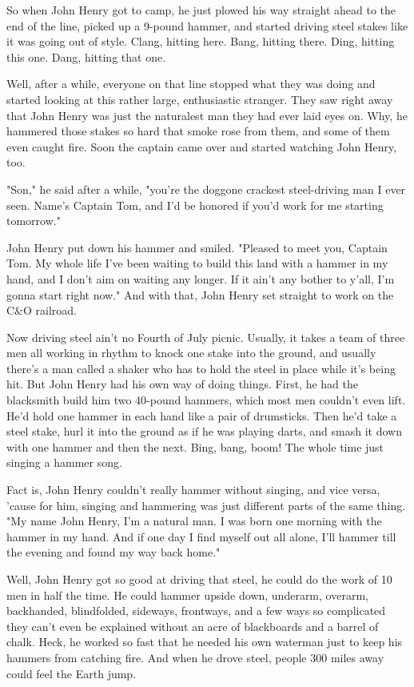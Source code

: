 So when John Henry got to camp, he just plowed his way straight ahead to the end of the line, picked up a 9-pound hammer, and started driving steel stakes like it was going out of style. Clang, hitting here. Bang, hitting there. Ding, hitting this one. Dang, hitting that one.

Well, after a while, everyone on that line stopped what they was doing and started looking at this rather large, enthusiastic stranger. They saw right away that John Henry was just the naturalest man they had ever laid eyes on. Why, he hammered those stakes so hard that smoke rose from them, and some of them even caught fire. Soon the captain came over and started watching John Henry, too.

"Son," he said after a while, "you're the doggone crackest steel-driving man I ever seen. Name's Captain Tom, and I'd be honored if you'd work for me starting tomorrow."

John Henry put down his hammer and smiled. "Pleased to meet you, Captain Tom. My whole life I've been waiting to build this land with a hammer in my hand, and I don't aim on waiting any longer. If it ain't any bother to y'all, I'm gonna start right now." And with that, John Henry set straight to work on the C\&O railroad.

Now driving steel ain't no Fourth of July picnic. Usually, it takes a team of three men all working in rhythm to knock one stake into the ground, and usually there's a man called a shaker who has to hold the steel in place while it's being hit. But John Henry had his own way of doing things. First, he had the blacksmith build him two 40-pound hammers, which most men couldn't even lift. He'd hold one hammer in each hand like a pair of drumsticks. Then he'd take a steel stake, hurl it into the ground as if he was playing darts, and smash it down with one hammer and then the next. Bing, bang, boom! The whole time just singing a hammer song.

Fact is, John Henry couldn't really hammer without singing, and vice versa, 'cause for him, singing and hammering was just different parts of the same thing. "My name John Henry, I'm a natural man. I was born one morning with the hammer in my hand. And if one day I find myself out all alone, I'll hammer till the evening and found my way back home."

Well, John Henry got so good at driving that steel, he could do the work of 10 men in half the time. He could hammer upside down, underarm, overarm, backhanded, blindfolded, sideways, frontways, and a few ways so complicated they can't even be explained without an acre of blackboards and a barrel of chalk. Heck, he worked so fast that he needed his own waterman just to keep his hammers from catching fire. And when he drove steel, people 300 miles away could feel the Earth jump.

